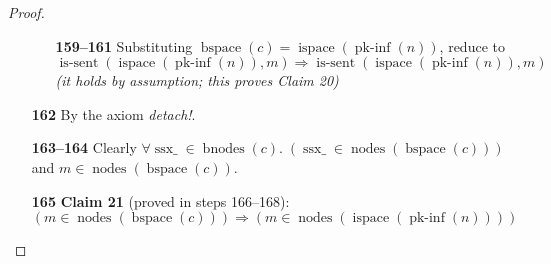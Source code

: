 \documentclass[11pt]{article}
\theoremstyle{plain}
\begin{document}
\begin{proof}
\begin{itemize}[leftmargin=2.8em, itemsep=4pt, parsep=1pt]
  \begin{itemize}[leftmargin=2.8em, itemsep=4pt, parsep=1pt]
  \item[\textbf{159--161}] Substituting $\operatorname{bspace}(c) = \operatorname{ispace}(\operatorname{pk\text{-}inf}(n))$, reduce to
\begin{equation*}
\operatorname{is\text{-}sent}(\operatorname{ispace}(\operatorname{pk\text{-}inf}(n)), m) \Rightarrow \operatorname{is\text{-}sent}(\operatorname{ispace}(\operatorname{pk\text{-}inf}(n)), m)
\end{equation*}
  \emph{(it holds by assumption; this proves Claim 20)}
  \end{itemize}
  \item[\textbf{162}] By the axiom \emph{detach!}.
  \item[\textbf{163--164}] Clearly $\forall \operatorname{ssx\_} \in \operatorname{bnodes}(c).\; (\operatorname{ssx\_} \in \operatorname{nodes}(\operatorname{bspace}(c)))$ and $m \in \operatorname{nodes}(\operatorname{bspace}(c))$.
  \item[\textbf{165}] \textbf{Claim 21} (proved in steps 166--168):
\begin{equation*}
(m \in \operatorname{nodes}(\operatorname{bspace}(c))) \Rightarrow (m \in \operatorname{nodes}(\operatorname{ispace}(\operatorname{pk\text{-}inf}(n))))
\end{equation*}


\end{itemize}
\end{proof}
\end{document}
